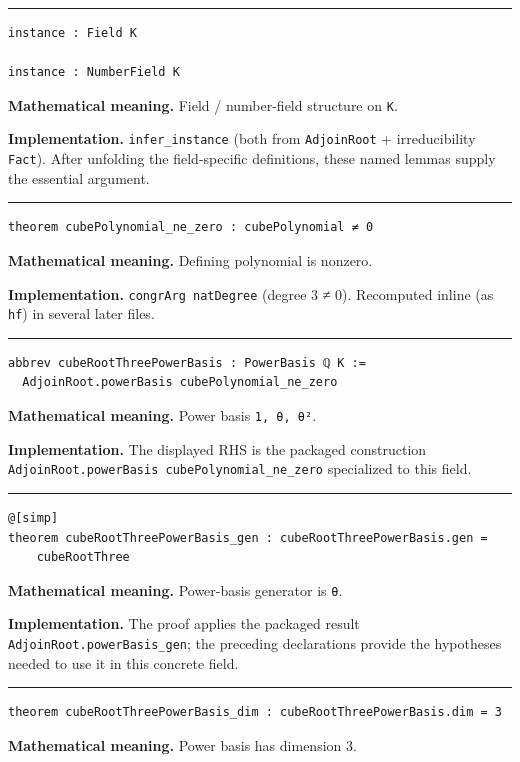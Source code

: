 \documentclass[UTF8,a4paper,11pt,fontset=fandol]{ctexart}
\theoremstyle{definition}
\newcommand{\statementsep}{\par\medskip\hrule\medskip}
\begin{document}
\statementsep
\begin{verbatim}
instance : Field K

instance : NumberField K
\end{verbatim}
\noindent\textbf{Mathematical meaning.} Field / number-field structure on \texttt{K}.\par
\noindent\textbf{Implementation.} \texttt{infer\_\allowbreak{}instance} (both from \texttt{AdjoinRoot} + irreducibility \texttt{Fact}). After unfolding the field-specific definitions, these named lemmas supply the essential argument.\par
\statementsep
\begin{verbatim}
theorem cubePolynomial_ne_zero : cubePolynomial ≠ 0
\end{verbatim}
\noindent\textbf{Mathematical meaning.} Defining polynomial is nonzero.\par
\noindent\textbf{Implementation.} \texttt{congrArg natDegree} (degree 3 ≠ 0). Recomputed inline (as \texttt{hf}) in several later files.\par
\statementsep
\begin{verbatim}
abbrev cubeRootThreePowerBasis : PowerBasis ℚ K :=
  AdjoinRoot.powerBasis cubePolynomial_ne_zero
\end{verbatim}
\noindent\textbf{Mathematical meaning.} Power basis \texttt{1, θ, θ²}.\par
\noindent\textbf{Implementation.} The displayed RHS is the packaged construction \texttt{AdjoinRoot.\allowbreak{}powerBasis cubePolynomial\_\allowbreak{}ne\_\allowbreak{}zero} specialized to this field.\par
\statementsep
\begin{verbatim}
@[simp]
theorem cubeRootThreePowerBasis_gen : cubeRootThreePowerBasis.gen =
    cubeRootThree
\end{verbatim}
\noindent\textbf{Mathematical meaning.} Power-basis generator is \texttt{θ}.\par
\noindent\textbf{Implementation.} The proof applies the packaged result \texttt{AdjoinRoot.\allowbreak{}powerBasis\_\allowbreak{}gen}; the preceding declarations provide the hypotheses needed to use it in this concrete field.\par
\statementsep
\begin{verbatim}
theorem cubeRootThreePowerBasis_dim : cubeRootThreePowerBasis.dim = 3
\end{verbatim}
\noindent\textbf{Mathematical meaning.} Power basis has dimension 3.\par
\end{document}
